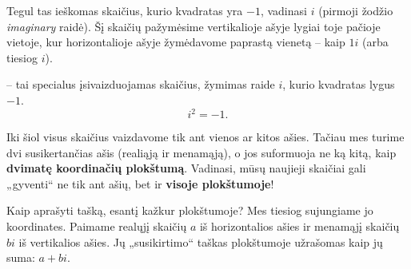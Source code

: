 \documentclass[11pt,a4paper]{scrartcl}
\begin{document}
Tegul tas ieškomas skaičius, kurio kvadratas yra $-1$, vadinasi $i$ (pirmoji žodžio \textit{imaginary} raidė). Šį skaičių pažymėsime vertikalioje ašyje lygiai toje pačioje vietoje, kur horizontalioje ašyje žymėdavome paprastą vienetą -- kaip $1i$ (arba tiesiog $i$).

\begin{center}
\end{center}

\begin{definition}
 -- tai specialus įsivaizduojamas skaičius, žymimas raide $i$, kurio kvadratas lygus $-1$.
\[ i^2 = -1. \]
\end{definition}

Iki šiol visus skaičius vaizdavome tik ant vienos ar kitos ašies. Tačiau mes turime dvi susikertančias ašis (realiąją ir menamąją), o jos suformuoja ne ką kitą, kaip \textbf{dvimatę koordinačių plokštumą}. Vadinasi, mūsų naujieji skaičiai gali „gyventi“ ne tik ant ašių, bet ir \textbf{visoje plokštumoje}! 

Kaip aprašyti tašką, esantį kažkur plokštumoje? Mes tiesiog sujungiame jo koordinates. Paimame realųjį skaičių $a$ iš horizontalios ašies ir menamąjį skaičių $bi$ iš vertikalios ašies. Jų „susikirtimo“ taškas plokštumoje užrašomas kaip jų suma: $a+bi$.

\begin{center}
\end{center}
\end{document}
